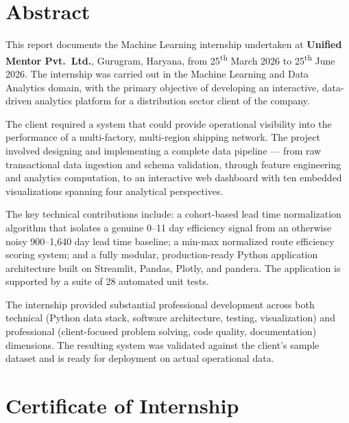 \documentclass[12pt, a4paper]{report}
\begin{document}
\setcounter{page}{1}
\chapter*{Abstract}

This report documents the Machine Learning internship undertaken at
\textbf{Unified Mentor Pvt.\ Ltd.}, Gurugram, Haryana, from
25\textsuperscript{th} March 2026 to 25\textsuperscript{th} June 2026.
The internship was carried out in the Machine Learning and Data Analytics
domain, with the primary objective of developing an interactive, data-driven
analytics platform for a distribution sector client of the company.

The client required a system that could provide operational visibility into
the performance of a multi-factory, multi-region shipping network. The project
involved designing and implementing a complete data pipeline — from raw
transactional data ingestion and schema validation, through feature
engineering and analytics computation, to an interactive web dashboard
with ten embedded visualizations spanning four analytical perspectives.

The key technical contributions include: a cohort-based lead time normalization
algorithm that isolates a genuine 0--11 day efficiency signal from an otherwise
noisy 900--1{,}640 day lead time baseline; a min-max normalized route
efficiency scoring system; and a fully modular, production-ready Python
application architecture built on Streamlit, Pandas, Plotly, and pandera.
The application is supported by a suite of 28 automated unit tests.

The internship provided substantial professional development across both
technical (Python data stack, software architecture, testing, visualization)
and professional (client-focused problem solving, code quality, documentation)
dimensions. The resulting system was validated against the client's sample
dataset and is ready for deployment on actual operational data.

\clearpage

\setcounter{page}{1}
\chapter*{Certificate of Internship}
\thispagestyle{plain}
\end{document}
